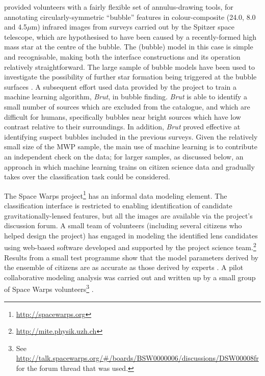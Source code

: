 \documentclass{ar2e}
\begin{document}
\citet{SimpsonEtal2012} provided volunteers with a fairly flexible set of
annulus-drawing tools, for annotating circularly-symmetric ``bubble'' features
in colour-composite (24.0, 8.0 and  4.5$\mu$m) infrared images from surveys
carried out by the Spitzer space telescope, which are hypothesised to have been
caused by a recently-formed high mass star at the centre of the bubble. The
(bubble) model in this case is simple and recognisable, making both the
interface constructions and its operation relatively straightforward. The large
sample of  bubble models have been used to investigate the possibility of
further star formation being triggered at the bubble surfaces
\citep{KendrewEtal2012}. A subsequent effort \citep{Beaumont} used data provided
by the project to train a machine learning algorithm, \emph{Brut}, in bubble
finding. \emph{Brut} is able to identify a small number of sources which are
excluded from the \citeauthor{SimpsonEtal2012} catalogue, and which are
difficult for humans, specifically bubbles near bright sources which have low
contrast relative to their surroundings. In addition, \emph{Brut} proved
effective at identifying suspect bubbles included in the previous surveys. Given
the relatively small size of the MWP sample, the main use of machine learning is
to contribute an independent check on the data; for larger samples, as discussed
below, an approach in which machine learning trains on citizen science data and
gradually takes over the classification task could be considered. 

 The Space Warps
project\footnote{\url{http://spacewarps.org}} has an informal data modeling
element. The classification interface is restricted to enabling identification
of candidate gravitationally-lensed features, but all the images are available
via the project's discussion forum. A small team of volunteers (including
several citizens who helped design the project) has engaged in modeling the 
identified lens candidates using web-based software developed and supported by
the project science
team.\footnote{\url{http://mite.physik.uzh.ch}} Results from a
small test programme show that the model parameters derived by the  ensemble
of citizens are as accurate as those derived by experts \citep{KuengEtal2014}.
A pilot collaborative modeling analysis was carried out and written up by a
small group of Space Warps volunteers\footnote{See
\url{http://talk.spacewarps.org/\#/boards/BSW0000006/discussions/DSW00008fr}
for the forum thread that was used.} \citep{Wilcox2014}.
\end{document}
